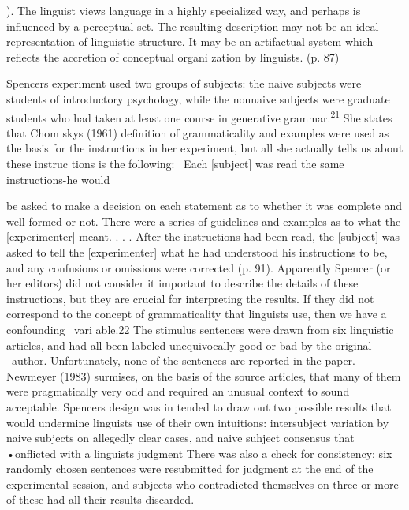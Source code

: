 \clearpage\setcounter{page}{1}\begin{styleStandard}
[1970a]). The linguist views language in a highly specialized way, and perhaps is influenced by a perceptual set. The resulting description may not be an ideal representation of linguistic structure. It may be an artifactual system which reflects the accretion of conceptual organi\- zation by linguists. (p. 87)
\end{styleStandard}


\begin{styleStandard}
Spencer{\textquotesingle}s experiment used two groups of subjects: the naive subjects were students of introductory psychology, while the nonnaive subjects were graduate students who had taken at least one course in generative grammar.\textsuperscript{21}\textsuperscript{ }She states that Chom\- sky{\textquotesingle}s (1961) definition of grammaticality and examples were used as the basis for the instructions in her experiment, but all she actually tells us about these instruc\- tions is the following: \ {\textquotedbl}Each [subject] was read the same instructions-he would
\end{styleStandard}


\begin{styleStandard}
be asked to make a decision on each statement as to whether it was complete and well-formed or not. There were a series of guidelines and examples as to what the [experimenter] meant. . . . After the instructions had been read, the [subject] was asked to tell the [experimenter] what he had understood his instructions to be, and any confusions or omissions were corrected{\textquotedbl} (p. 91). Apparently Spencer (or her editors) did not consider it important to describe the details of these instructions, but they are crucial for interpreting the results. If they did not correspond to the concept of grammaticality that linguists use, then we have a confounding \ vari\- able.22 The stimulus sentences were drawn from six linguistic articles, and had all been labeled unequivocally good or bad by the original \ author. Unfortunately, none of the sentences are reported in the paper. Newmeyer (1983) surmises, on the basis of the source articles, that many of them were pragmatically very odd and required an unusual context to sound acceptable. Spencer{\textquotesingle}s design was in\- tended to draw out two possible results that would undermine linguists{\textquotesingle} use of their own intuitions: intersubject variation by naive subjects on allegedly clear cases, and naive suhject consensus that •onflicted with a linguist{\textquotesingle}s judgment There was also a check for consistency: six randomly chosen sentences were resubmitted for judgment at the end of the experimental session, and subjects who contradicted themselves on three or more of these had all their results discarded.
\end{styleStandard}


